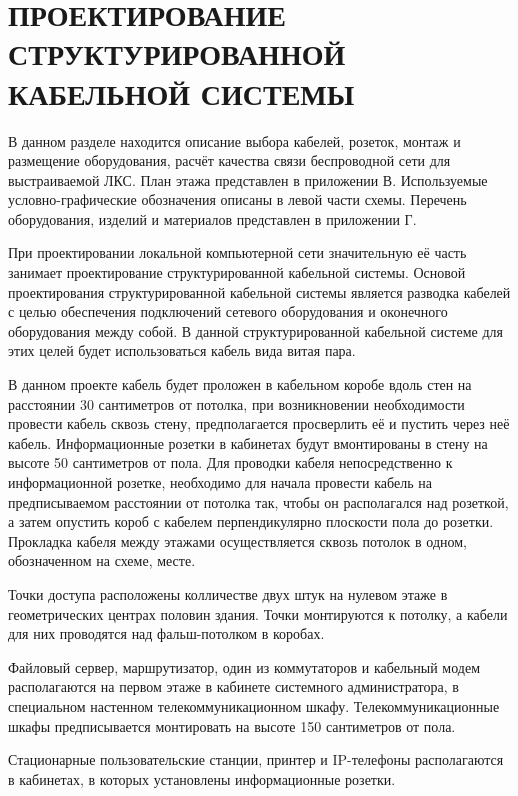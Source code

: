 \section{ПРОЕКТИРОВАНИЕ СТРУКТУРИРОВАННОЙ КАБЕЛЬНОЙ СИСТЕМЫ}
\label{sec:dev}

В данном разделе находится описание выбора кабелей, розеток, монтаж и размещение оборудования,
расчёт качества связи беспроводной сети для выстраиваемой ЛКС.
План этажа представлен в приложении В.
Используемые условно-графические обозначения описаны в левой части схемы.
Перечень оборудования, изделий и материалов представлен в приложении Г.

При проектировании локальной компьютерной сети значительную её часть занимает проектирование структурированной кабельной системы.
Основой проектирования структурированной кабельной системы является разводка кабелей с целью обеспечения подключений сетевого оборудования и оконечного оборудования между собой.
В данной структурированной кабельной системе для этих целей будет использоваться кабель вида витая пара.

В данном проекте кабель будет проложен в кабельном коробе вдоль стен на расстоянии 30 сантиметров от потолка,
при возникновении необходимости провести кабель сквозь стену, предполагается просверлить её и пустить через неё кабель.
Информационные розетки в кабинетах будут вмонтированы в стену на высоте 50 сантиметров от пола.
Для проводки кабеля непосредственно к информационной розетке, необходимо для начала провести кабель на предписываемом расстоянии от потолка так,
чтобы он располагался над розеткой, а затем опустить короб с кабелем перпендикулярно плоскости пола до розетки.
Прокладка кабеля между этажами осуществляется сквозь потолок в одном, обозначенном на схеме, месте.

Точки доступа расположены колличестве двух штук на нулевом этаже в геометрических центрах половин здания.
Точки монтируются к потолку, а кабели для них проводятся над фальш-потолком в коробах.

Файловый сервер, маршрутизатор, один из коммутаторов и кабельный модем располагаются на первом этаже в кабинете системного администратора,
в специальном настенном телекоммуникационном шкафу.
Телекоммуникационные шкафы предписывается монтировать на высоте 150 сантиметров от пола.

Стационарные пользовательские станции, принтер и IP-телефоны располагаются в кабинетах, в которых установлены информационные розетки.

%

